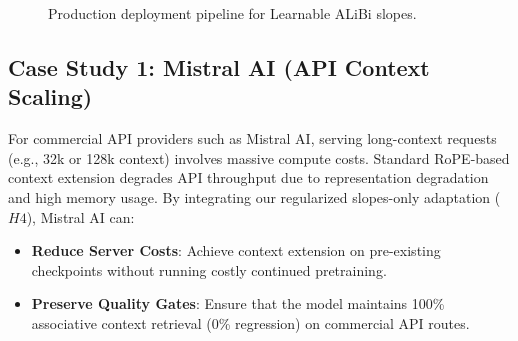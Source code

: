 \documentclass[11pt,journal,compsoc]{IEEEtran}
\begin{document}
\begin{figure}[h]
\centering
{}
\caption{Production deployment pipeline for Learnable ALiBi slopes.}
\label{fig:deployment}
\end{figure}

\subsection{Case Study 1: Mistral AI (API Context Scaling)}
For commercial API providers such as Mistral AI, serving long-context requests (e.g., 32k or 128k context) involves massive compute costs. Standard RoPE-based context extension degrades API throughput due to representation degradation and high memory usage. 
By integrating our regularized slopes-only adaptation ($H4$), Mistral AI can:
\begin{itemize}
    \item \textbf{Reduce Server Costs}: Achieve context extension on pre-existing checkpoints without running costly continued pretraining.
    \item \textbf{Preserve Quality Gates}: Ensure that the model maintains 100\% associative context retrieval (0\% regression) on commercial API routes.
\end{itemize}
\end{document}
